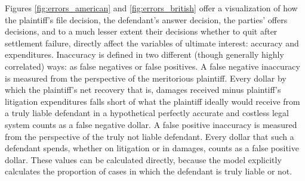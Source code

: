 \documentclass{article}
\begin{document}
Figures \ref{fig:errors_american} and \ref{fig:errors_british} offer a visualization of how the plaintiff's file decision, the defendant's answer decision, the parties' offers decisions, and to a much lesser extent their decisions whether to quit after settlement failure, directly affect the variables of ultimate interest: accuracy and expenditures. Inaccuracy is defined in two different (though generally highly correlated) ways: as false negatives or false positives. A false negative inaccuracy is measured from the perspective of the meritorious plaintiff. Every dollar by which the plaintiff's net recovery \textemdash that is, damages received minus plaintiff's litigation expenditures \textemdash falls short of what the plaintiff ideally would receive from a truly liable defendant in a hypothetical perfectly accurate and costless legal system counts as a false negative dollar. A false positive inaccuracy is measured from the perspective of the truly not liable defendant. Every dollar that such a defendant spends, whether on litigation or in damages, counts as a false positive dollar. These values can be calculated directly, because the model explicitly calculates the proportion of cases in which the defendant is truly liable or not.
\end{document}

